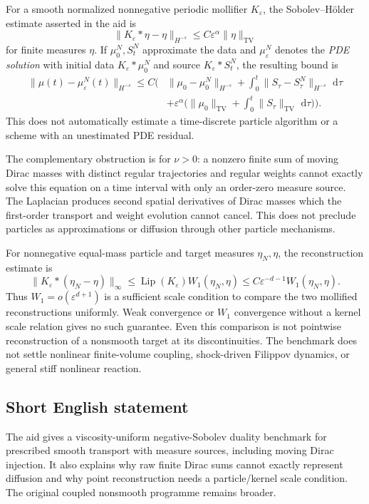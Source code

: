 \documentclass[11pt]{article}
\newcommand{\dd}{\,\mathrm{d}}
\begin{document}
For a smooth normalized nonnegative periodic mollifier \(K_\varepsilon\), the Sobolev--H\"older estimate asserted in the aid is
\[
 \|K_\varepsilon*\eta-\eta\|_{H^{-s}}
 \le C\varepsilon^\alpha\|\eta\|_{\mathrm{TV}}
\]
for finite measures \(\eta\). If \(\mu_0^N,S_t^N\) approximate the data and \(\mu_\varepsilon^N\) denotes the \emph{PDE solution} with initial data \(K_\varepsilon*\mu_0^N\) and source \(K_\varepsilon*S_t^N\), the resulting bound is
\[
\begin{aligned}
 \|\mu(t)-\mu_\varepsilon^N(t)\|_{H^{-s}}
 \le C\biggl(&\|\mu_0-\mu_0^N\|_{H^{-s}}
 +\int_0^t\|S_\tau-S_\tau^N\|_{H^{-s}}\,\dd\tau\\
 &+\varepsilon^\alpha\bigl(\|\mu_0\|_{\mathrm{TV}}
 +\int_0^t\|S_\tau\|_{\mathrm{TV}}\,\dd\tau\bigr)\biggr).
\end{aligned}
\]
This does not automatically estimate a time-discrete particle algorithm or a scheme with an unestimated PDE residual.

The complementary obstruction is for \(\nu>0\): a nonzero finite sum of moving Dirac masses with distinct regular trajectories and regular weights cannot exactly solve this equation on a time interval with only an order-zero measure source. The Laplacian produces second spatial derivatives of Dirac masses which the first-order transport and weight evolution cannot cancel. This does not preclude particles as approximations or diffusion through other particle mechanisms.

For nonnegative equal-mass particle and target measures \(\eta_N,\eta\), the reconstruction estimate is
\[
 \|K_\varepsilon*(\eta_N-\eta)\|_\infty
 \le \operatorname{Lip}(K_\varepsilon)W_1(\eta_N,\eta)
 \le C\varepsilon^{-d-1}W_1(\eta_N,\eta).
\]
Thus \(W_1=o(\varepsilon^{d+1})\) is a sufficient scale condition to compare the two mollified reconstructions uniformly. Weak convergence or \(W_1\) convergence without a kernel scale relation gives no such guarantee. Even this comparison is not pointwise reconstruction of a nonsmooth target at its discontinuities. The benchmark does not settle nonlinear finite-volume coupling, shock-driven Filippov dynamics, or general stiff nonlinear reaction.
\subsection{Short English statement}
The aid gives a viscosity-uniform negative-Sobolev duality benchmark for prescribed smooth transport with measure sources, including moving Dirac injection. It also explains why raw finite Dirac sums cannot exactly represent diffusion and why point reconstruction needs a particle/kernel scale condition. The original coupled nonsmooth programme remains broader.
\end{document}
